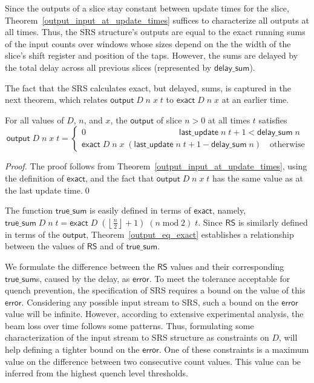 \documentclass{llncs}
\begin{document}
Since the outputs of a slice stay constant between update times for the slice, Theorem~\ref{output_input_at_update_times} suffices to characterize all outputs at all times.
Thus, the SRS structure's outputs are equal to the exact running sums of the input counts over windows whose sizes depend on the the width of the slice's shift register and position of the taps.
However, the sums are delayed by the total delay across all previous slices (represented by $\mathsf{delay\_sum}$).

The fact that the SRS calculates exact, but delayed, sums, is captured in the next theorem, which relates $\mathsf{output}\;D\;n\;x\;t$ to $\mathsf{exact}\;D\;n\;x$ at an earlier time.

\begin{theorem}\label{output_eq_exact}
For all values of $D$, $n$, and $x$, the $\mathsf{output}$ of slice $n>0$ at all times $t$ satisfies
\begin{equation*}
\mathsf{output}\;D\;n\;x\;t=\begin{cases}0\qquad\qquad\qquad\qquad\qquad\quad\mathsf{last\_update}\;n\;t+1<\mathsf{delay\_sum}\;n\\\mathsf{exact}\;D\;n\;x\;(\mathsf{last\_update}\;n\;t+1-\mathsf{delay\_sum}\;n)\quad\text{otherwise}\end{cases}
\end{equation*}
\end{theorem}
\begin{proof}
The proof follows from Theorem~\ref{output_input_at_update_times}, using the definition of $\mathsf{exact}$, and the fact that $\mathsf{output}\;D\;n\;x\;t$ has the same value as at the last update time.\qed
\end{proof}

The function $\mathsf{true\_sum}$ is easily defined in terms of $\mathsf{exact}$, namely, $\mathsf{true\_sum}\;D\;n\;t = \mathsf{exact}\;D\;\left(\left\lfloor\frac{n}{2}\right\rfloor+1\right)\;(n\operatorname{mod}2)\;t$.
Since $\mathsf{RS}$ is similarly defined in terms of the $\mathsf{output}$, Theorem~\ref{output_eq_exact} establishes a relationship between the values of $\mathsf{RS}$ and of $\mathsf{true\_sum}$.

We formulate the difference between the $\mathsf{RS}$ values and their corresponding $\mathsf{true\_sum}$s, caused by the delay, as $\mathsf{error}$.
To meet the tolerance acceptable for quench prevention, the specification of SRS requires a bound on the value of this $\mathsf{error}$.
Considering any possible input stream to SRS, such a bound on the $\mathsf{error}$ value will be infinite.
However, according to extensive experimental analysis, the beam loss over time follows some patterns.
Thus, formulating some characterization of the input stream to SRS structure as constraints on $D$, will help defining a tighter bound on the $\mathsf{error}$.
One of these constraints is a maximum value on the difference between two consecutive count values.
This value can be inferred from the highest quench level thresholds.
\end{document}
